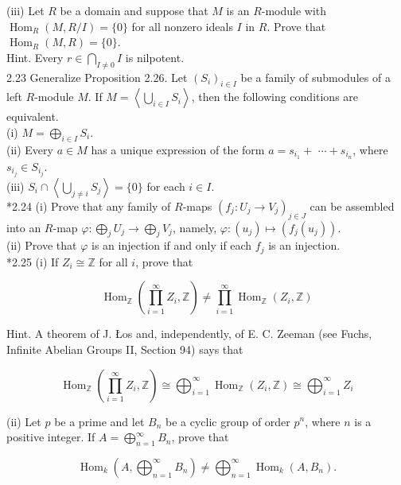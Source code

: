 \documentclass[10pt, letterpaper]{article}
\begin{document}
(iii) Let $R$ be a domain and suppose that $M$ is an $R$-module with $\operatorname{Hom}_{R}(M, R / I)=\{0\}$ for all nonzero ideals $I$ in $R$. Prove that $\operatorname{Hom}_{R}(M, R)=\{0\}$.\\
Hint. Every $r \in \bigcap_{I \neq 0} I$ is nilpotent.\\
2.23 Generalize Proposition 2.26. Let $\left(S_{i}\right)_{i \in I}$ be a family of submodules of a left $R$-module $M$. If $M=\left\langle\bigcup_{i \in I} S_{i}\right\rangle$, then the following conditions are equivalent.\\
(i) $M=\bigoplus_{i \in I} S_{i}$.\\
(ii) Every $a \in M$ has a unique expression of the form $a=s_{i_{1}}+$ $\cdots+s_{i_{n}}$, where $s_{i_{j}} \in S_{i_{j}}$.\\
(iii) $S_{i} \cap\left\langle\bigcup_{j \neq i} S_{j}\right\rangle=\{0\}$ for each $i \in I$.\\
*2.24 (i) Prove that any family of $R$-maps $\left(f_{j}: U_{j} \rightarrow V_{j}\right)_{j \in J}$ can be assembled into an $R$-map $\varphi: \bigoplus_{j} U_{j} \rightarrow \bigoplus_{j} V_{j}$, namely, $\varphi:\left(u_{j}\right) \mapsto\left(f_{j}\left(u_{j}\right)\right)$.\\
(ii) Prove that $\varphi$ is an injection if and only if each $f_{j}$ is an injection.\\
*2.25 (i) If $Z_{i} \cong \mathbb{Z}$ for all $i$, prove that

$$
\operatorname{Hom}_{\mathbb{Z}}\left(\prod_{i=1}^{\infty} Z_{i}, \mathbb{Z}\right) \neq \prod_{i=1}^{\infty} \operatorname{Hom}_{\mathbb{Z}}\left(Z_{i}, \mathbb{Z}\right)
$$

Hint. A theorem of J. Łos and, independently, of E. C. Zeeman (see Fuchs, Infinite Abelian Groups II, Section 94) says that

$$
\operatorname{Hom}_{\mathbb{Z}}\left(\prod_{i=1}^{\infty} Z_{i}, \mathbb{Z}\right) \cong \bigoplus_{i=1}^{\infty} \operatorname{Hom}_{\mathbb{Z}}\left(Z_{i}, \mathbb{Z}\right) \cong \bigoplus_{i=1}^{\infty} Z_{i}
$$

(ii) Let $p$ be a prime and let $B_{n}$ be a cyclic group of order $p^{n}$, where $n$ is a positive integer. If $A=\bigoplus_{n=1}^{\infty} B_{n}$, prove that

$$
\operatorname{Hom}_{k}\left(A, \bigoplus_{n=1}^{\infty} B_{n}\right) \neq \bigoplus_{n=1}^{\infty} \operatorname{Hom}_{k}\left(A, B_{n}\right) .
$$
\end{document}
